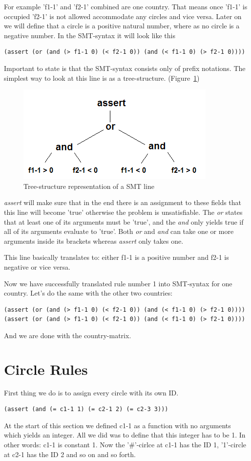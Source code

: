 For example 'f1-1' and 'f2-1' combined are one country. That means once 'f1-1' is occupied 'f2-1' is not allowed accommodate any circles and vice versa. Later on we will define that a circle is a positive natural number, where as no circle is a negative number. In the SMT-syntax it will look like this
\begin{lstlisting}
(assert (or (and (> f1-1 0) (< f2-1 0)) (and (< f1-1 0) (> f2-1 0))))
\end{lstlisting}
Important to state is that the SMT-syntax consists only of prefix notations. The simplest way to look at this line is as a tree-structure. (Figure~\ref{fig:tree_structure})
\begin{figure}
  \centering
  \includegraphics[scale=1]{Pictures/tree_structure.png} 
  \caption{Tree-structure representation of a SMT line}
  \label{fig:tree_structure}
\end{figure}

\emph{assert} will make sure that in the end there is an assignment to these fields that this line will become 'true' otherwise the problem is unsatisfiable. The \emph{or} states that at least one of its arguments must be 'true', and the \emph{and} only yields true if all of its arguments evaluate to 'true'. Both \emph{or} and \emph{and} can take one or more arguments inside its brackets whereas \emph{assert} only takes one.

This line basically translates to: either f1-1 is a positive number and f2-1 is negative or vice versa.

Now we have successfully translated rule number 1 into SMT-syntax for one country. Let's do the same with the other two countries:
\begin{lstlisting}
(assert (or (and (> f1-1 0) (< f2-1 0)) (and (< f1-1 0) (> f2-1 0))))
(assert (or (and (> f1-1 0) (< f2-1 0)) (and (< f1-1 0) (> f2-1 0))))
\end{lstlisting}
And we are done with the country-matrix.

\section{Circle Rules}
First thing we do is to assign every circle with its own ID.
\begin{lstlisting}
(assert (and (= c1-1 1) (= c2-1 2) (= c2-3 3)))
\end{lstlisting}
At the start of this section we defined c1-1 as a function with no arguments which yields an integer. All we did was to define that this integer has to be 1. In other words: c1-1 is constant 1.
Now the '\#'-cirlce at c1-1 has the ID 1, '1'-circle at c2-1 has the ID 2 and so on and so forth.

